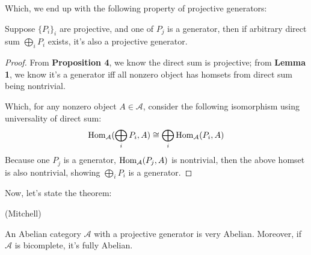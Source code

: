 \documentclass{article}
\begin{document}
Which, we end up with the following property of projective generators:
\begin{lem}
    Suppose $\{P_i\}_i$ are projective, and one of $P_j$ is a generator, then if arbitrary direct sum $\bigoplus_i P_i$ exists, it's also a projective generator.
\end{lem}
\begin{proof}
    From \textbf{Proposition 4}, we know the direct sum is projective; from \textbf{Lemma 1}, we know it's a generator iff all nonzero object has homsets from direct sum being nontrivial.

    Which, for any nonzero object $A\in\mathcal{A}$, consider the following isomorphism using universality of direct sum:
    \begin{align}
        \mathrm{Hom}_\mathcal{A}(\bigoplus_i P_i,A)\cong \bigoplus_i\mathrm{Hom}_\mathcal{A}(P_i,A)
    \end{align}
    Because one $P_j$ is a generator, $\mathrm{Hom}_{\mathcal{A}}(P_j,A)$ is nontrivial, then the above homset is also nontrivial, showing $\bigoplus_i P_i$ is a generator.
\end{proof}

\newpage

Now, let's state the theorem:
\begin{thm}{(Mitchell)}
    
    An Abelian category $\mathcal{A}$ with a projective generator is very Abelian. Moreover, if $\mathcal{A}$ is bicomplete, it's fully Abelian.
\end{thm}
\end{document}
